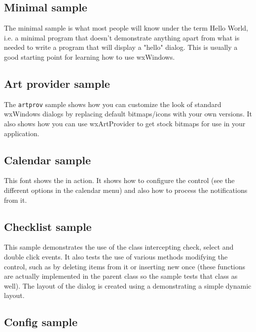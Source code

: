 \subsection{Minimal sample}\label{sampleminimal}

The minimal sample is what most people will know under the term Hello World,
i.e. a minimal program that doesn't demonstrate anything apart from what is
needed to write a program that will display a "hello" dialog. This is usually
a good starting point for learning how to use wxWindows.


\subsection{Art provider sample}\label{sampleartprovider}

The {\tt artprov} sample shows how you can customize the look of standard
wxWindows dialogs by replacing default bitmaps/icons with your own versions.
It also shows how you can use wxArtProvider to
get stock bitmaps for use in your application.


\subsection{Calendar sample}\label{samplecalendar}

This font shows the  in action. It
shows how to configure the control (see the different options in the calendar
menu) and also how to process the notifications from it.


\subsection{Checklist sample}\label{samplechecklist}

This sample demonstrates the use of the 
class intercepting check, select and double click events. It also tests the
use of various methods modifying the control, such as by deleting items
from it or inserting new once (these functions are actually implemented in
the parent class  so the sample tests that class
as well). The layout of the dialog is created using a 
demonstrating a simple dynamic layout.


\subsection{Config sample}\label{sampleconfig}

